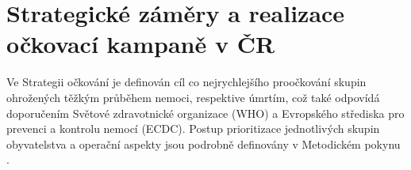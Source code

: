 




\section*{Strategické záměry a realizace očkovací kampaně v ČR}
\label{sec:strategie}

Ve Strategii očkování \cite{strategie_covid} je definován cíl co nejrychlejšího proočkování skupin ohrožených těžkým průběhem nemoci, respektive úmrtím, což také odpovídá doporučením Světové zdravotnické organizace (WHO) a Evropského střediska pro prevenci a kontrolu nemocí (ECDC). Postup prioritizace jednotlivých skupin obyvatelstva a operační aspekty jsou podrobně definovány v Metodickém pokynu \cite{ockovani_mp}. %
%

